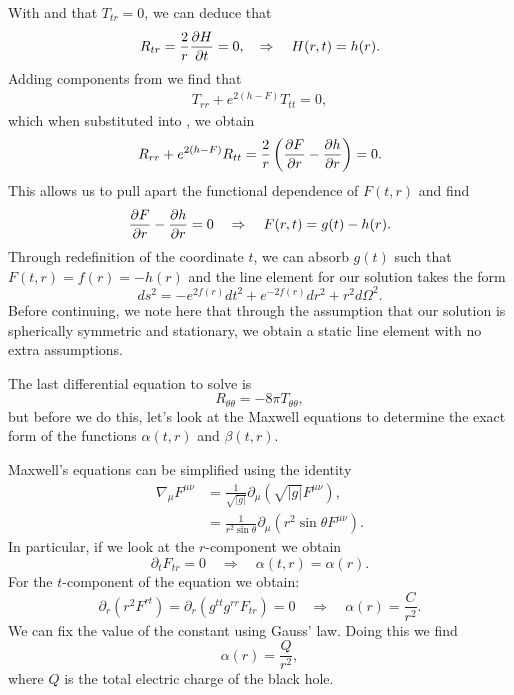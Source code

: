 With  and that $T_{tr} = 0$, we can deduce that
\begin{equation*}
	R_{tr} = \frac{2}{r} \frac{\partial H}{\partial t} = 0, \quad \Rightarrow \quad H(r,t) = h(r).
\end{equation*}
Adding components from  we find that
\begin{equation*}
   \begin{aligned}
     T_{rr} + e^{2(h-F)}T_{tt} = 0,
   \end{aligned}
\end{equation*}
which when substituted into , we obtain
\begin{equation*}
	R_{rr} +  e^{2(h-F)} R_{tt} = \frac{2}{r} \left( \frac{\partial F}{\partial r} - \frac{\partial h}{\partial r} \right) = 0.
\end{equation*}
This allows us to pull apart the functional dependence of $F(t,r)$ and find
\begin{equation*}
	\frac{\partial F}{\partial r} - \frac{\partial h}{\partial r} = 0 \quad \Rightarrow \quad F(r,t) = g(t) - h(r).
\end{equation*}
Through redefinition of the coordinate $t$, we can absorb $g(t)$ such that $F(t,r) = f(r) = -h(r)$ and the line element for our solution takes the form
\begin{equation*}
   ds^2 = -e^{2f(r)} dt^2 + e^{-2f(r)} dr^2 + r^2 d\Omega^2.
\end{equation*}
Before continuing, we note here that through the assumption that our solution is spherically symmetric and stationary, we obtain a static line element with no extra assumptions.

The last differential equation to solve is
\begin{equation}
\label{eq:lbit}
    R_{\theta \theta} = -8 \pi T_{\theta \theta},
\end{equation}
but before we do this, let's look at the Maxwell equations to determine the exact form of the functions $\alpha(t,r)$ and $\beta(t,r)$.
 
Maxwell's equations can be simplified using the identity
\begin{equation*}
\begin{aligned}
     \nabla_\mu F^{\mu \nu} &= \frac{1}{\sqrt{|g|}} \partial_\mu (\sqrt{|g|} F^{\mu \nu}), \\
     &= \frac{1}{r^2\sin \theta} \partial_\mu (r^2\sin \theta F^{\mu \nu}).
\end{aligned}
\end{equation*}
In particular, if we look at the $r$-component we obtain
\begin{equation}
   \partial_t F_{tr} = 0 \quad \Rightarrow \quad \alpha(t,r) = \alpha(r).
\end{equation}
For the $t$-component of the equation we obtain:
\begin{equation*}
   \partial_r (r^2 F^{rt}) = \partial_r (g^{tt}g^{rr}F_{tr}) = 0 \quad \Rightarrow \quad \alpha(r) = \frac{C}{r^2}.
\end{equation*}
We can fix the value of the constant using Gauss' law. Doing this we find
\begin{equation*}
   \alpha(r) =\frac{Q}{r^2},
\end{equation*}
where $Q$ is the total electric charge of the black hole.
 
